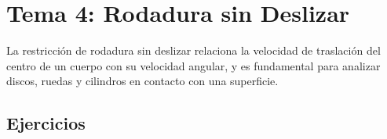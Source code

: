 
\section{Tema 4: Rodadura sin Deslizar}

La restricción de rodadura sin deslizar relaciona la velocidad de traslación
del centro de un cuerpo con su velocidad angular, y es fundamental para
analizar discos, ruedas y cilindros en contacto con una superficie.

\subsection{Ejercicios}


\clearpage

\clearpage

\clearpage

\clearpage
